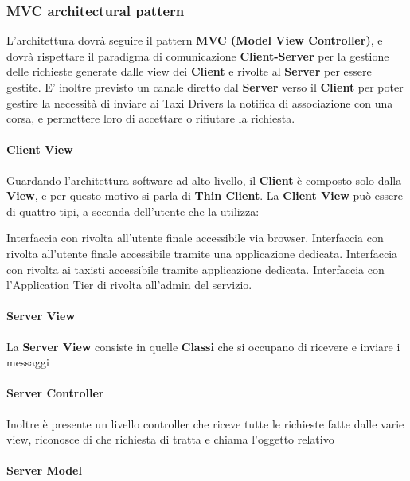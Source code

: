 \subsubsection{MVC architectural pattern}
L'architettura dovrà seguire il pattern \textbf{MVC (Model View Controller)}, e dovrà rispettare il paradigma di comunicazione \textbf{Client-Server} per la gestione delle richieste generate dalle view dei \textbf{Client} e rivolte al \textbf{Server} per essere gestite. 
E' inoltre previsto un canale diretto dal \textbf{Server} verso il \textbf{Client} per poter gestire la necessità di inviare ai Taxi Drivers la notifica di associazione con una corsa, e permettere loro di accettare o rifiutare la richiesta.
\paragraph{Client View}
Guardando l'architettura software ad alto livello, il \textbf{Client} è composto solo dalla \textbf{View}, e per questo motivo si parla di \textbf{Thin Client}. 
La \textbf{Client View} può essere di quattro tipi, a seconda dell'utente che la utilizza: 
\begin{itemize}
	 Interfaccia con \myTaxiService{} rivolta all'utente finale accessibile via browser.
	 Interfaccia con \myTaxiService{} rivolta all'utente finale accessibile tramite una applicazione dedicata.
	 Interfaccia con \myTaxiService{} rivolta ai taxisti accessibile tramite applicazione dedicata.
	 Interfaccia con l'Application Tier di \myTaxiSerice{} rivolta all'admin del servizio.
\end{itemize}
\paragraph{Server View}
La \textbf{Server View} consiste in quelle \textbf{Classi} che si occupano di ricevere e inviare i messaggi
\paragraph{Server Controller}
Inoltre è presente un livello controller che riceve tutte le richieste fatte dalle varie view, riconosce di che richiesta di tratta e chiama l'oggetto relativo 
\paragraph{Server Model}

